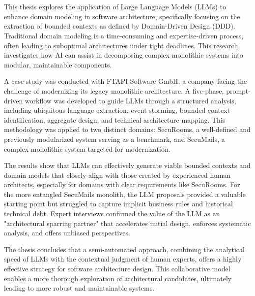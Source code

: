 \chapter{\abstractname}


This thesis explores the application of Large Language Models (LLMs) to enhance domain modeling in software architecture, specifically focusing on the extraction of bounded contexts as defined by Domain-Driven Design (DDD). Traditional domain modeling is a time-consuming and expertise-driven process, often leading to suboptimal architectures under tight deadlines. This research investigates how AI can assist in decomposing complex monolithic systems into modular, maintainable components.

A case study was conducted with FTAPI Software GmbH, a company facing the challenge of modernizing its legacy monolithic architecture. A five-phase, prompt-driven workflow was developed to guide LLMs through a structured analysis, including ubiquitous language extraction, event storming, bounded context identification, aggregate design, and technical architecture mapping. This methodology was applied to two distinct domains: SecuRooms, a well-defined and previously modularized system serving as a benchmark, and SecuMails, a complex monolithic system targeted for modernization.

The results show that LLMs can effectively generate viable bounded contexts and domain models that closely align with those created by experienced human architects, especially for domains with clear requirements like SecuRooms. For the more entangled SecuMails monolith, the LLM proposals provided a valuable starting point but struggled to capture implicit business rules and historical technical debt. Expert interviews confirmed the value of the LLM as an "architectural sparring partner" that accelerates initial design, enforces systematic analysis, and offers unbiased perspectives.

The thesis concludes that a semi-automated approach, combining the analytical speed of LLMs with the contextual judgment of human experts, offers a highly effective strategy for software architecture design. This collaborative model enables a more thorough exploration of architectural candidates, ultimately leading to more robust and maintainable systems.